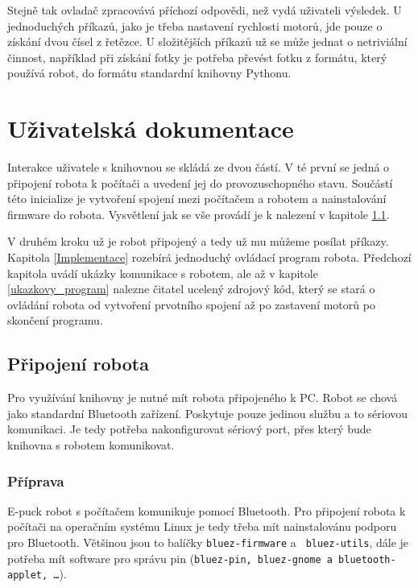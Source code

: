 \documentclass[12pt,notitlepage]{report}
\begin{document}
    Stejně tak ovladač zpracovává příchozí odpovědi, než vydá uživateli
    výsledek. U jednoduchých příkazů, jako je třeba nastavení rychlosti motorů,
    jde pouze o získání dvou čísel z řetězce. U složitějších příkazů už se může
    jednat o netriviální činnost, například při získání fotky je potřeba
    převést fotku z formátu, který používá robot, do formátu standardní
    knihovny Pythonu.

\chapter{Uživatelská dokumentace} %
\label{dokumentace}

    Interakce uživatele s knihovnou se skládá ze dvou částí. V té první se
    jedná o připojení robota k počítači a uvedení jej do provozuschopného
    stavu. Součástí této inicialize je vytvoření spojení mezi počítačem a
    robotem a nainstalování firmware do robota. Vysvětlení jak se vše provádí
    je k nalezení v kapitole \ref{pripojeni_robota}.

    V druhém kroku už je robot připojený a tedy už mu můžeme posílat příkazy.
    Kapitola \ref{Implementace} rozebírá jednoduchý ovládací program robota.
    Předchozí kapitola uvádí ukázky komunikace s robotem, ale až v kapitole
    \ref{ukazkovy_program} nalezne čitatel ucelený zdrojový kód, který se stará
    o ovládání robota od vytvoření prvotního spojení až po zastavení motorů po
    skončení programu.

    \section{Připojení robota}
    \label{pripojeni_robota}

    Pro využívání knihovny je nutné mít robota připojeného k PC. Robot se chová
    jako standardní Bluetooth zařízení. Poskytuje pouze jedinou službu a to
    sériovou komunikaci. Je tedy potřeba nakonfigurovat sériový port, přes
    který bude knihovna s robotem komunikovat.

    \subsection{Příprava}

    E-puck robot s počítačem komunikuje pomocí Bluetooth. Pro připojení robota
    k počítači na operačním systému Linux je tedy třeba mít nainstalovánu
    podporu pro Bluetooth. Většinou jsou to balíčky {\tt bluez-firmware} a {\tt
    bluez-utils}, dále je potřeba mít software pro správu pin ({\tt bluez-pin,
    bluez-gnome a bluetooth-applet, \ldots}).
\end{document}
